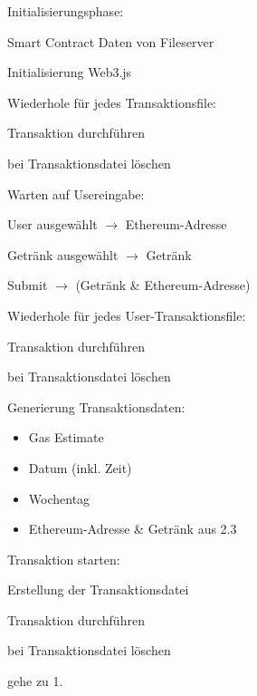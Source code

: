 \begin{legal}
	\item Initialisierungsphase:
	\begin{legal}
		\item {} Smart Contract Daten von Fileserver
		\item Initialisierung Web3.js
		\item Wiederhole für jedes Transaktionsfile:
		\begin{legal}
			\item Transaktion durchführen
			\item bei  Transaktionsdatei löschen
		\end{legal}
	\end{legal}
	\item Warten auf Usereingabe:
	\begin{legal}
		\item User ausgewählt $\rightarrow$ Ethereum-Adresse
		\item Getränk ausgewählt $\rightarrow$ Getränk
		\item Submit $\rightarrow$ (Getränk \& Ethereum-Adresse)
	\end{legal}
	\item Wiederhole für jedes User-Transaktionsfile:
	\begin{legal}
		\item Transaktion durchführen
		\item bei  Transaktionsdatei löschen
	\end{legal}
	\item Generierung Transaktionsdaten:
	\begin{itemize}
		\item Gas Estimate
		\item Datum (inkl. Zeit)
		\item Wochentag
		\item Ethereum-Adresse \& Getränk aus 2.3
	\end{itemize}
	\item Transaktion starten:
	\begin{legal}
		\item Erstellung der Transaktionsdatei
		\item Transaktion durchführen
		\item bei  Transaktionsdatei löschen
		\item gehe zu 1.
	\end{legal} 	
\end{legal}

